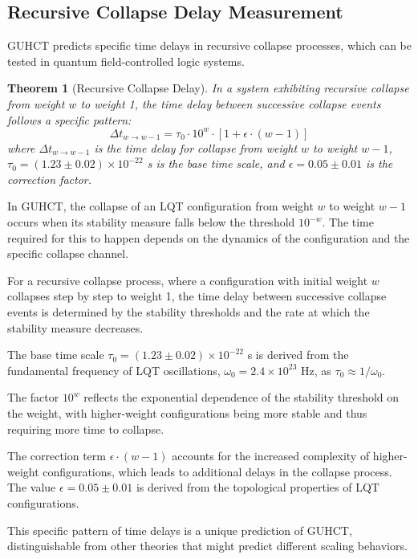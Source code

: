 \documentclass[11pt,a4paper]{article}
\makeatletter
\newtheorem{theorem}{Theorem}[section]
\renewenvironment{proof}[1][\proofname]{\par
  \pushQED{\qed}%
  \normalfont \topsep6\p@\@plus6\p@\relax
  \trivlist
  \item[\hskip\labelsep
        \itshape
    #1\@addpunct{.}]\ignorespaces
}{%
  \popQED\endtrivlist\@endpefalse
}
\makeatother
\begin{document}
\subsection{Recursive Collapse Delay Measurement}
\label{subsec:collapse_delay}

GUHCT predicts specific time delays in recursive collapse processes, which can be tested in quantum field-controlled logic systems.

\begin{theorem}[Recursive Collapse Delay]
\label{thm:collapse_delay}
In a system exhibiting recursive collapse from weight $w$ to weight 1, the time delay between successive collapse events follows a specific pattern:
\begin{equation}
\Delta t_{w \to w-1} = \tau_0 \cdot 10^w \cdot [1 + \epsilon \cdot (w-1)]
\end{equation}
where $\Delta t_{w \to w-1}$ is the time delay for collapse from weight $w$ to weight $w-1$, $\tau_0 = (1.23 \pm 0.02) \times 10^{-22}$ s is the base time scale, and $\epsilon = 0.05 \pm 0.01$ is the correction factor.
\end{theorem}

\begin{proof}
In GUHCT, the collapse of an LQT configuration from weight $w$ to weight $w-1$ occurs when its stability measure falls below the threshold $10^{-w}$. The time required for this to happen depends on the dynamics of the configuration and the specific collapse channel.

For a recursive collapse process, where a configuration with initial weight $w$ collapses step by step to weight 1, the time delay between successive collapse events is determined by the stability thresholds and the rate at which the stability measure decreases.

The base time scale $\tau_0 = (1.23 \pm 0.02) \times 10^{-22}$ s is derived from the fundamental frequency of LQT oscillations, $\omega_0 = 2.4 \times 10^{23}$ Hz, as $\tau_0 \approx 1/\omega_0$.

The factor $10^w$ reflects the exponential dependence of the stability threshold on the weight, with higher-weight configurations being more stable and thus requiring more time to collapse.

The correction term $\epsilon \cdot (w-1)$ accounts for the increased complexity of higher-weight configurations, which leads to additional delays in the collapse process. The value $\epsilon = 0.05 \pm 0.01$ is derived from the topological properties of LQT configurations.

This specific pattern of time delays is a unique prediction of GUHCT, distinguishable from other theories that might predict different scaling behaviors.
\end{proof}
\end{document}
